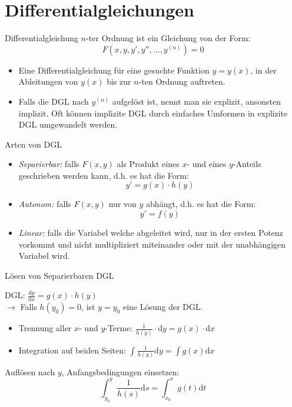 \section{Differentialgleichungen}

\begin{definition}{Differentialgleichung}
  \(n\)-ter Ordnung ist ein Gleichung von der Form:
      \[F(x,y,y',y'',\ldots,y^{(n)})=0\]
  \begin{itemize}
    \item Eine Differentialgleichung 
      für eine gesuchte Funktion \(y=y(x)\), in der Ableitungen von \(y(x)\) bis zur \(n\)-ten Ordnung auftreten.
    \item Falls die DGL nach \(y^{(n)}\) aufgelöst ist, nennt man sie explizit, ansonsten implizit.
      Oft können implizite DGL durch einfaches Umformen in explizite DGL umgewandelt werden.
  \end{itemize}
\end{definition}

\begin{definition}{Arten von DGL}
  \begin{itemize}
    \item \emph{Separierbar:} falls \(F(x,y)\) als Produkt eines \(x\)- und eines \(y\)-Anteils geschrieben
      werden kann, d.h. es hat die Form:
      \[y'=g(x)\cdot h(y)\]
    \item \emph{Autonom:} falls \(F(x,y)\) nur von \(y\) abhängt, d.h. es hat die Form:
      \[y'=f(y)\]
    \item \emph{Linear:} falls die Variabel welche abgeleitet wird, nur in der ersten Potenz vorkommt und nicht
      multipliziert miteinander oder mit der unabhängigen Variabel wird.
  \end{itemize}
\end{definition}

\begin{KR}{Lösen von Separierbaren DGL}
  \begin{center}
    DGL:
      $\frac{\mathrm{d}y}{\mathrm{d}x}=g(x)\cdot h(y)$\\
      \vspace{1mm}
      $\rightarrow$ Falls \(h(y_0)=0\), ist \(y=y_0\) eine Lösung der DGL.
  \end{center}
  \begin{itemize}
    \item Trennung aller \(x\)- und \(y\)-Terme:
    $\frac{1}{h(y)}\cdot \mathrm{d}y=g(x)\cdot \mathrm{d}x$
    \item Integration auf beiden Seiten:
    $\int{\frac{1}{h(y)}\mathrm{d}y}=\int{g(x)\mathrm{d}x}$
    \end{itemize}
  Auflösen nach \(y\), Anfangsbedingungen einsetzen:
      \[\int_{y_0}^{y}{\frac{1}{h(s)}\mathrm{d}s}=\int_{x_0}^{x}{g(t)\mathrm{d}t}\]
\end{KR}

